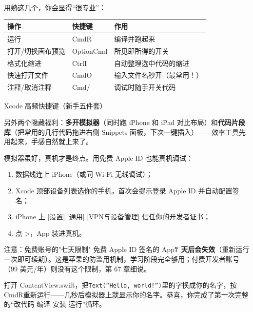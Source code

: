 用熟这几个，你会显得“很专业”：

\begin{center}
\begin{tabularx}{\linewidth}{|X|X|X|}
\hline
\textbf{操作} & \textbf{快捷键} & \textbf{作用} \tabularnewline
\hline
运行 & CmdR & 编译并跑起来 \tabularnewline
打开/切换画布预览 & OptionCmd & 所见即所得的开关 \tabularnewline
格式化缩进 & CtrlI & 自动整理选中代码的缩进 \tabularnewline
快速打开文件 & CmdO & 输入文件名秒开（最常用！） \tabularnewline
注释/取消注释 & Cmd/ & 调试时随手开关代码 \tabularnewline
\hline
\end{tabularx}
\end{center}

\begin{center}\small\color{gray}Xcode 高频快捷键（新手五件套）\end{center}

另外两个隐藏福利：\textbf{多开模拟器}（同时跑 iPhone 和 iPad 对比布局）和\textbf{代码片段库}（把常用的几行代码拖进右侧 Snippets 面板，下次一键插入）——效率工具先用起来，手感自然就上来了。


模拟器虽好，真机才是终点。用免费 Apple ID 也能真机调试：

\begin{enumerate}
  \item 数据线连上 iPhone（或同 Wi-Fi 无线调试）；
  \item Xcode 顶部设备列表选你的手机，首次会提示登录 Apple ID 并自动配置签名；
  \item iPhone 上 [设置] [通用] [VPN与设备管理] 信任你的开发者证书；
  \item 点 >，App 装进真机。
\end{enumerate}

\begin{tcbwarn}{注意：免费账号的"七天限制"}
免费 Apple ID 签名的 App\textbf{7 天后会失效}（重新运行一次即可续期）。这是苹果的防滥用机制，学习阶段完全够用；付费开发者账号（99 美元/年）则没有这个限制，第 67 章细说。

\end{tcbwarn}



打开 ContentView.swift，把\texttt{Text(“Hello, world!”)}里的字换成你的名字，按CmdR重新运行——几秒后模拟器上就显示你的名字。恭喜，你完成了第一次完整的“改代码 编译 安装 运行”循环。

